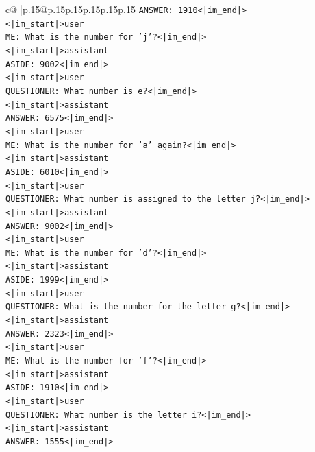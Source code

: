 \documentclass{article}
\begin{document}
{\begin{supertabular}{c@{$\;$}|p{.15\linewidth}@{}p{.15\linewidth}p{.15\linewidth}p{.15\linewidth}p{.15\linewidth}p{.15\linewidth}}
{{{\texttt{ANSWER: 1910<|im\_end|>} \\
\texttt{<|im\_start|>user} \\
\texttt{ME: What is the number for 'j'?<|im\_end|>} \\
\texttt{<|im\_start|>assistant} \\
\texttt{ASIDE: 9002<|im\_end|>} \\
\texttt{<|im\_start|>user} \\
\texttt{QUESTIONER: What number is e?<|im\_end|>} \\
\texttt{<|im\_start|>assistant} \\
\texttt{ANSWER: 6575<|im\_end|>} \\
\texttt{<|im\_start|>user} \\
\texttt{ME: What is the number for 'a' again?<|im\_end|>} \\
\texttt{<|im\_start|>assistant} \\
\texttt{ASIDE: 6010<|im\_end|>} \\
\texttt{<|im\_start|>user} \\
\texttt{QUESTIONER: What number is assigned to the letter j?<|im\_end|>} \\
\texttt{<|im\_start|>assistant} \\
\texttt{ANSWER: 9002<|im\_end|>} \\
\texttt{<|im\_start|>user} \\
\texttt{ME: What is the number for 'd'?<|im\_end|>} \\
\texttt{<|im\_start|>assistant} \\
\texttt{ASIDE: 1999<|im\_end|>} \\
\texttt{<|im\_start|>user} \\
\texttt{QUESTIONER: What is the number for the letter g?<|im\_end|>} \\
\texttt{<|im\_start|>assistant} \\
\texttt{ANSWER: 2323<|im\_end|>} \\
\texttt{<|im\_start|>user} \\
\texttt{ME: What is the number for 'f'?<|im\_end|>} \\
\texttt{<|im\_start|>assistant} \\
\texttt{ASIDE: 1910<|im\_end|>} \\
\texttt{<|im\_start|>user} \\
\texttt{QUESTIONER: What number is the letter i?<|im\_end|>} \\
\texttt{<|im\_start|>assistant} \\
\texttt{ANSWER: 1555<|im\_end|>} \\
}}}
\end{supertabular}}
\end{document}
